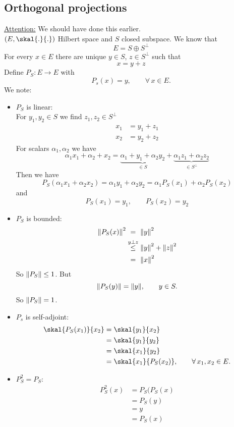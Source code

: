 \subsection{Orthogonal projections} 
\label{sub:orthogonal_projections}
\underline{Attention:} We should have done this earlier. \\
$(E, \skal{.}{.})$ Hilbert space and $S$ closed subspace. We know that
\[
	E = S \oplus S^{\perp}
\]
For every $x \in E$ there are unique $y \in S$, $z \in S^{\perp}$ such that
\[
	x = y + z
\]
Define $P_S: E \to E$ with
\[
	P_s(x)= y, \qquad \forall\, x \in E.
\]
We note:
\begin{itemize}
	\item $P_S$ is linear: \\
	For $y_1,y_2 \in S$ we find $z_1,z_2 \in S^{\perp}$
	\begin{align*}
		x_1 &= y_1 + z_1 \\
		x_2 &= y_2 + z_2
	\end{align*}
	For scalars $\alpha_1,\alpha_2$ we have
	\[
		\alpha_1 x_1 + \alpha_2 + x_2 = \underset{\in S}{\underbrace{\alpha_1 + y_1 + \alpha_2 y_2}} + \underset{\in S^{\perp}}{\underbrace{\alpha_1 z_1 + \alpha_2 z_2}}
	\]
	Then we have
	\[
		P_S(\alpha_1 x_1 + \alpha_2 x_2) = \alpha_1 y_1 + \alpha_2 y_2 = \alpha_1 P_S(x_1) + \alpha_2 P_S(x_2)
	\]
	and
	\[
		P_S(x_1) =y_1, \qquad P_S(x_2)=y_2
	\]
	\item $P_S$ is bounded: \\
	\begin{align*}
		\norm{P_S(x)}^2 & \stackrel{\hphantom{y \perp z}}{=} \norm{y}^2 \\
		& \stackrel{y \perp z}{\leq } \norm{y}^2 + \norm{z}^2 \\
		& \stackrel{\hphantom{y \perp z}}{=} \norm{x}^2
	\end{align*}
	So $\norm{P_S} \leq 1$. But
	\[
		\norm{P_S(y)} = \norm{y}, \qquad y \in S.
	\]
	So $\norm{P_S}=1$.
	\item $P_s$ is self-adjoint: \\
	\begin{align*}
		\skal{P_S(x_1)}{x_2} &= \skal{y_1}{x_2} \\
		&= \skal{y_1}{y_2} \\
		&= \skal{x_1}{y_2} \\
		&= \skal{x_1}{P_S(x_2)}, \qquad \forall\, x_1,x_2 \in E.
	\end{align*}
	\item $P_S^2=P_S$:
	\begin{align*}
		P_S^2(x) &= P_S(P_S(x) \\
		&= P_S(y) \\
		&= y \\
		&= P_S(x)
	\end{align*}
\end{itemize}
 
